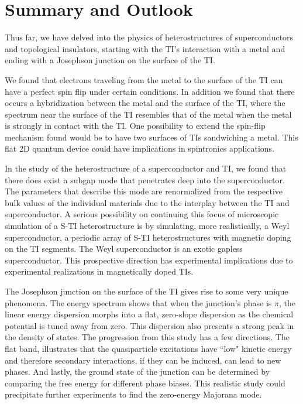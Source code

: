 

\chapter{Summary and Outlook}

Thus far, we have delved into the physics of heterostructures of superconductors and topological insulators, starting with the TI's interaction with a metal and ending with a Josephson junction on the surface of the TI. 

We found that electrons traveling from the metal to the surface of the TI can have a perfect spin flip under certain conditions. 
In addition we found that there occurs a hybridization between the metal and the surface of the TI, where the spectrum near the surface of the TI resembles that of the metal when the metal is strongly in contact with the TI. 
One possibility to extend the spin-flip mechanism found would be to have two surfaces of TIs sandwiching a metal. This flat 2D quantum device could have implications in spintronics applications.

In the study of the heterostructure of a superconductor and TI, we found that there does exist a subgap mode that penetrates deep into the superconductor. The parameters that describe this mode are renormalized from the respective bulk values of the individual materials due to the interplay between the TI and superconductor. A serious possibility on continuing this focus of microscopic simulation of a S-TI heterostructure is by simulating, more realistically, a Weyl superconductor, a periodic array of S-TI heterostructures with magnetic doping on the TI segments. The Weyl superconductor is an exotic gapless superconductor\cite{meng_weyl_2012}. This prospective direction has experimental implications due to experimental realizations in magnetically doped TIs\cite{liu_magnetic_2009,chen_massive_2010,zhang_topology-driven_2013}. 

The Josephson junction on the surface of the TI gives rise to some very unique phenomena. The energy spectrum shows that when the junction's phase is $\pi$, the linear energy dispersion morphs into a flat, zero-slope dispersion as the chemical potential is tuned away from zero. This dispersion also presents a strong peak in the density of states. 
The progression from this study has a few directions. The flat band, illustrates that the quasiparticle excitations have ``low" kinetic energy and therefore secondary interactions, if they can be induced, can lead to new phases. And lastly, the ground state of the junction can be determined by comparing the free energy for different phase biases. This realistic study could precipitate further experiments to find the zero-energy Majorana mode.

